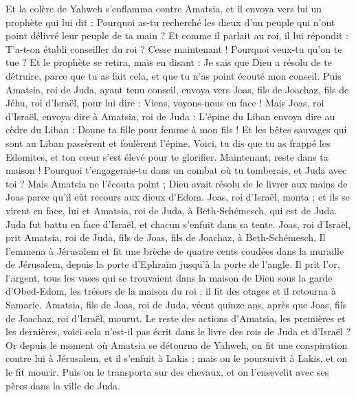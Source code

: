 \begin{multicols}{2}
Et la colère de Yahweh s'enflamma contre Amatsia, et il envoya vers lui un prophète qui lui dit : Pourquoi as-tu recherché les dieux d'un peuple qui n'ont point délivré leur peuple de ta main ?
Et comme il parlait au roi, il lui répondit : T'a-t-on établi conseiller du roi ? Cesse maintenant ! Pourquoi veux-tu qu'on te tue ? Et le prophète se retira, mais en disant : Je sais que Dieu a résolu de te détruire, parce que tu as fait cela, et que tu n'as point écouté mon conseil.
Puis Amatsia, roi de Juda, ayant tenu conseil, envoya vers Joas, fils de Joachaz, fils de Jéhu, roi d'Israël, pour lui dire : Viens, voyons-nous en face !
Mais Joas, roi d'Israël, envoya dire à Amatsia, roi de Juda : L'épine du Liban envoya dire au cèdre du Liban : Donne ta fille pour femme à mon fils ! Et les bêtes sauvages qui sont au Liban passèrent et foulèrent l'épine.
Voici, tu dis que tu as frappé les Edomites, et ton cœur s'est élevé pour te glorifier. Maintenant, reste dans ta maison ! Pourquoi t'engagerais-tu dans un combat où tu tomberais, et Juda avec toi ?
Mais Amatsia ne l'écouta point ; Dieu avait résolu de le livrer aux mains de Joas parce qu'il eût recours aux dieux d'Edom.
Joas, roi d'Israël, monta ; et ils se virent en face, lui et Amatsia, roi de Juda, à Beth-Schémesch, qui est de Juda.
Juda fut battu en face d'Israël, et chacun s'enfuit dans sa tente.
Joas, roi d'Israël, prit Amatsia, roi de Juda, fils de Joas, fils de Joachaz, à Beth-Schémesch. Il l'emmena à Jérusalem et fit une brèche de quatre cents coudées dans la muraille de Jérusalem, depuis la porte d'Ephraïm jusqu'à la porte de l'angle.
Il prit l'or, l'argent, tous les vases qui se trouvaient dans la maison de Dieu sous la garde d'Obed-Edom, les trésors de la maison du roi ; il fit des otages et il retourna à Samarie.
Amatsia, fils de Joas, roi de Juda, vécut quinze ans, après que Joas, fils de Joachaz, roi d'Israël, mourut.
Le reste des actions d'Amatsia, les premières et les dernières, voici cela n'est-il pas écrit dans le livre des rois de Juda et d'Israël ?
Or depuis le moment où Amatsia se détourna de Yahweh, on fit une conspiration contre lui à Jérusalem, et il s'enfuit à Lakis ; mais on le poursuivit à Lakis, et on le fit mourir.
Puis on le transporta sur des chevaux, et on l'ensevelit avec ses pères dans la ville de Juda.

\end{multicols}
